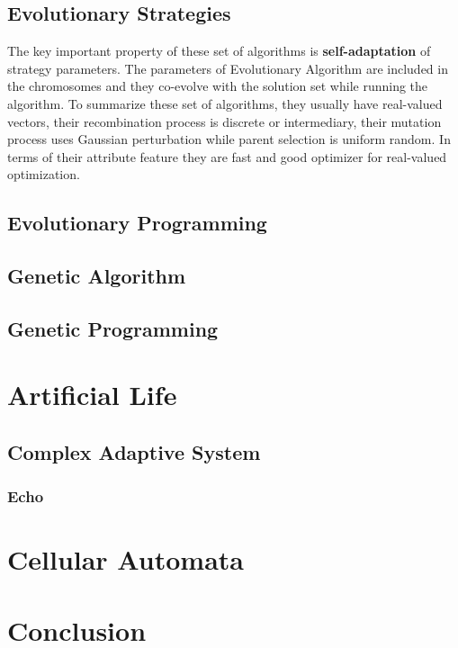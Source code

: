 \subsection{Evolutionary Strategies}
The key important property of these set of algorithms is \textbf{self-adaptation} of strategy parameters. The  parameters of Evolutionary Algorithm are included in the chromosomes and they co-evolve with the solution set while running the algorithm. To summarize these set of algorithms, they usually have real-valued vectors, their recombination process is discrete or intermediary, their mutation process uses Gaussian perturbation while parent selection is uniform random. In terms of their attribute feature they are fast and good optimizer for real-valued optimization.

\subsection{Evolutionary Programming}

\subsection{Genetic Algorithm}

\subsection{Genetic Programming}

\section{Artificial Life}

\subsection{Complex Adaptive System}

\subsubsection{Echo}

\section{Cellular Automata}

\section{Conclusion}
